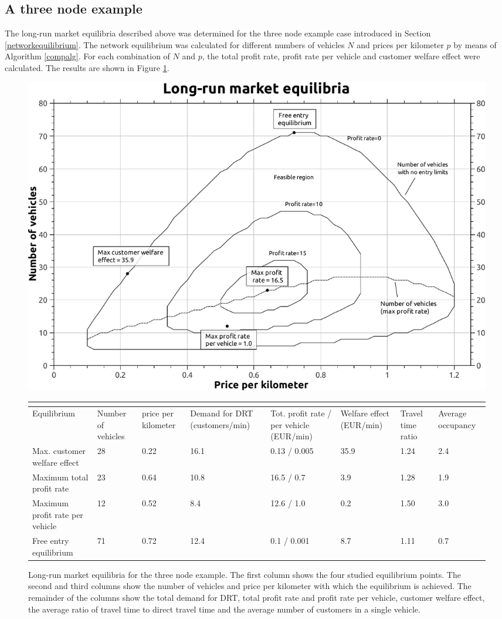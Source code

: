 \documentclass[dissertation,draft*]{aaltoseries}
\begin{document}
\subsection{A three node example}
The long-run market equilibria described above was determined for the three node example case introduced
in Section \ref{networkequilibrium}. The network equilibrium was calculated for different numbers
of vehicles $N$ and prices per kilometer $p$ by means of Algorithm \ref{compalg}.
For each combination of $N$ and $p$, the total profit rate, profit 
rate per vehicle and customer welfare effect were calculated. The results are shown in Figure \ref{a-equilibria01}.

\begin{figure}[ht]
\begin{center}
\includegraphics[width=0.9\columnwidth]{a-equilibria01}
\\
{\scriptsize
\begin{tabular}{|p{2.0cm}|p{1.0cm}|p{1.0cm}|p{1.5cm}|p{1.4cm}|p{1.2cm}|p{0.75cm}|p{0.9cm}|}
\multicolumn{8}{c}{} \\
\hline
Equilibrium & Number of vehicles & price per kilometer & Demand for DRT (customers/min) & 
Tot. profit rate / per vehicle (EUR/min) & Welfare effect (EUR/min) & Travel time ratio & Average occupancy \\
\hline
Max. customer welfare effect & 28 & 0.22 & 16.1 & 0.13 / 0.005 & 35.9 & 1.24 & 2.4 \\
\hline
Maximum total profit rate & 23 & 0.64 & 10.8 & 16.5 / 0.7 & 3.9 & 1.28 & 1.9 \\
\hline
Maximum profit rate per vehicle & 12 & 0.52 & 8.4 & 12.6 / 1.0 & 0.2 & 1.50 & 3.0 \\
\hline
Free entry equilibrium & 71 & 0.72 & 12.4 & 0.1 / 0.001 & 8.7 & 1.11 & 0.7 \\
\hline
\end{tabular}
}
\caption{Long-run market equilibria for the three node example. The first column shows the
four studied equilibrium points. The second and third columns show the 
number of vehicles and price per kilometer with which the equilibrium is achieved.
The remainder of the columns show the total demand for DRT, total profit rate and profit rate
per vehicle, customer welfare effect, the average ratio of travel time to direct travel time
and the average number of customers in a single vehicle.}
\label{a-equilibria01}
\end{center}
\end{figure}
\end{document}
